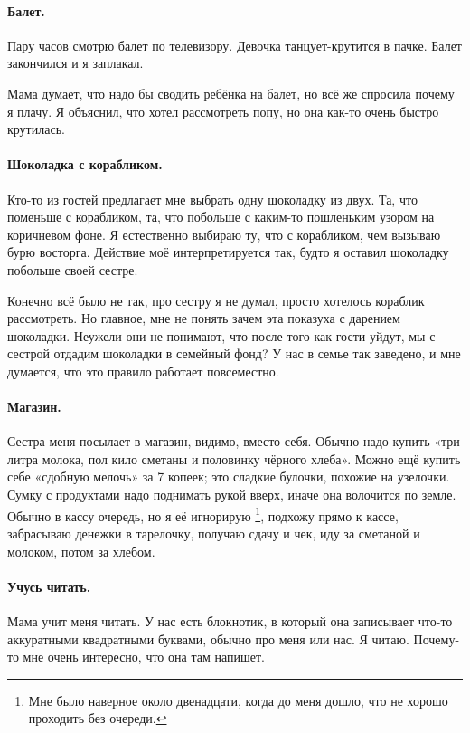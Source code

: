 \documentclass{book}
\begin{document}
\paragraph{Балет.}
Пару часов смотрю балет по телевизору.
Девочка танцует-крутится в пачке.
Балет закончился и я заплакал.

Мама думает, что надо бы сводить ребёнка на балет,
но всё же спросила почему я плачу.
Я объяснил, что хотел рассмотреть попу, но она как-то очень быстро крутилась.

\paragraph{Шоколадка с корабликом.}
Кто-то из гостей предлагает мне выбрать одну шоколадку из двух.
Та, что поменьше с корабликом, та, что побольше с каким-то пошленьким узором на коричневом фоне.
Я естественно выбираю ту, что с корабликом, чем вызываю бурю восторга. 
Действие моё интерпретируется так, будто я оставил шоколадку побольше своей сестре.

Конечно всё было не так, про сестру я не думал, просто хотелось кораблик рассмотреть.
Но главное, мне не понять зачем эта показуха с дарением шоколадки.
Неужели они не понимают, что после того как гости уйдут, мы с сестрой отдадим шоколадки в семейный фонд?
У нас в семье так заведено, и мне думается, что это правило работает повсеместно.

{\sloppy

\paragraph{Магазин.}
Сестра меня посылает в магазин, видимо, вместо себя.
Обычно надо купить «три литра молока, пол кило сметаны и половинку чёрного хлеба».
Можно ещё купить себе «сдобную мелочь» за 7 копеек;
это сладкие булочки, похожие на узелочки.
Сумку с продуктами надо поднимать рукой вверх,
иначе она волочится по земле.
Обычно в кассу очередь, но я её игнорирую%
\footnote{Мне было наверное около двенадцати, когда до меня дошло, что не хорошо проходить без очереди.}, 
подхожу прямо к кассе, забрасываю денежки в тарелочку, получаю сдачу и чек, иду за сметаной и молоком,
потом за хлебом.

}

\paragraph{Учусь читать.}
Мама учит меня читать.
У нас есть блокнотик, в который она записывает что-то 
аккуратными квадратными буквами, обычно про меня или нас.
Я читаю.
Почему-то мне очень интересно, что она там напишет.
\end{document}
